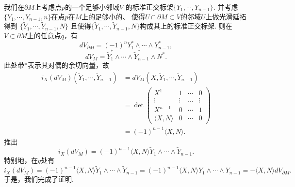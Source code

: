 \begin{itemize}
        \qquad 我们在$\partial M$上考虑点$p$的一个足够小邻域$V$
        的标准正交标架$\{Y_1,\cdots,Y_{n-1}\}$. 
        并考虑$\{Y_1,\cdots, Y_{n-1}, n\}$在点$p$在$M$上的足够小的、
        使得$U\cap \partial M\subset V$的邻域$U$上做光滑延拓得到
        $\{\tilde{Y}_1,\cdots,\tilde{Y}_{n-1},N\}$
        且使得$\{\tilde{Y}_1,\cdots, \tilde{Y}_{n-1}, N\}$构成其上的标准正交标架.
    则在$V\subset \partial M$上的任意点$q$，有   
            $$dV_{\partial M}=(-1)^nY_1^*\wedge \cdots \wedge Y_{n-1}^*,$$
            $$dV_M=\tilde{Y}_1^*\wedge \cdots \wedge \tilde{Y}_{n-1}^*\wedge N^*.$$
    此处带$*$表示其对偶的余切向量，故
            \begin{align}
                i_X(dV_M)(\tilde{Y}_1,\cdots,\tilde{Y}_{n-1})&=dV_M(X,\tilde{Y}_1,\cdots,\tilde{Y}_{n-1})\\
                    &=\det \begin{pmatrix}
                        X^1 &1 &\cdots &0\\
                        \vdots &\vdots &\ldots &\vdots\\
                        X^{n-1} &0 &\cdots &1\\
                        \langle X, N\rangle &0 &\cdots &0
                    \end{pmatrix}\\
                    &=(-1)^{n-1} \langle X, N\rangle.
            \end{align}
        推出
            $$i_X(dV_M)=(-1)^{n-1}\langle X, N\rangle \tilde{Y}_1\wedge \cdots \wedge \tilde{Y}_{n-1}.$$
        特别地，在$q$处有
            $$i_X(dV_M)=(-1)^{n-1}\langle X, N\rangle \tilde{Y}_1\wedge \cdots \wedge \tilde{Y}_{n-1}
            =(-1)^{n-1}\langle X, N\rangle Y_1\wedge \cdots\wedge Y_{n-1}
            =-\langle X, N\rangle dV_{\partial M}.$$
        于是，我们完成了证明.


\end{itemize}

